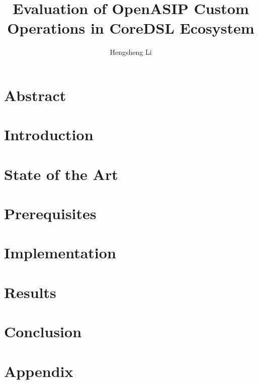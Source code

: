 \documentclass[
  a4paper,            %
  thesis=student,     %
  english,            %
  coverpage=false,    %
  titlepage=false,    %
  oneside,            %
  font=times          %
]{tumbook}
\title{Evaluation of OpenASIP Custom Operations in CoreDSL Ecosystem}
\subtitle{}
\author{Hengsheng Li}
\begin{document}
\frontmatter
\maketitle
\chapter{Abstract}

\tableofcontents

\mainmatter
\chapter{Introduction}


\chapter{State of the Art}


\chapter{Prerequisites}


\chapter{Implementation}


\chapter{Results}


\chapter{Conclusion}


\appendix
\chapter{Appendix}
\lipsum[4]

\backmatter


\end{document}
